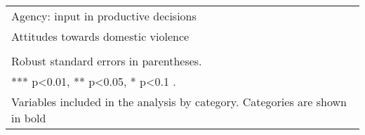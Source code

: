 \begin{longtable}{m{13cm}}
Agency: input in productive decisions\\
Attitudes towards domestic violence \\
\midrule
\begin{minipage}{13cm}
\small{
{\textit Notes:} \\
Robust standard errors in parentheses. \\
*** p\textless{}0.01, ** p\textless{}0.05, * p\textless{}0.1 . \\
Variables included in the analysis by category. Categories are shown in bold
}
\end{minipage} \\* \bottomrule
\end{longtable}
